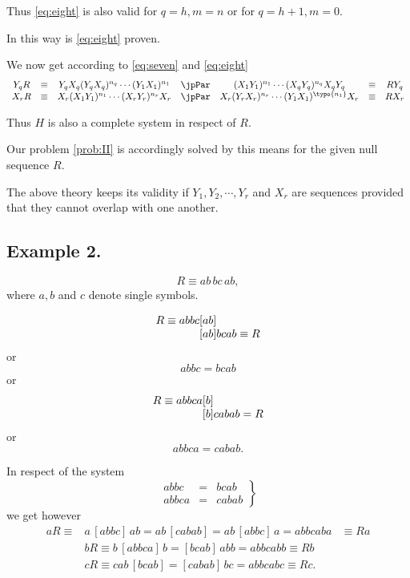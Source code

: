 Thus \eqref{eq:eight} is also valid for $q=h, m=n$ or for  $q=h+1,
m=0$.

In this way is \eqref{eq:eight} proven.

We now get according to \eqref{eq:seven} and \eqref{eq:eight}
$$\begin{array}{ccccccc}
Y_q R &\equiv& Y_qX_q(Y_qX_q)^{n_q}\cdots(Y_1X_1)^{n_1} &\jpPar&
(X_1Y_1)^{n_1}\cdots(X_qY_q)^{n_q}X_qY_q &\equiv& RY_q\\
X_r R &\equiv& X_r(X_1Y_1)^{n_1}\cdots(X_rY_r)^{n_r}X_r &\jpPar&
X_r(Y_rX_r)^{n_r}\cdots(Y_1X_1)^{\typo{n_1}}X_r &\equiv& R X_r\\
\end{array}$$

Thus $H$ is also a complete system in respect of $R$.

\bigskip

Our problem \ref{prob:II} is accordingly solved by this means for the given
null sequence $R$.

The above theory keeps its validity if $Y_1,Y_2,\cdots,Y_r$ and
$X_r$ are sequences provided that they cannot overlap with one another.

\subsection{Example 2.}

$$R \equiv ab\, bc\, ab, $$
where $a, b$ and $c$ denote single symbols.

$$\begin{array}{r@{}c@{}l}
R \equiv abbc & [ab] \\
              & [ab] & bcab \equiv R
\end{array}$$
or
$$abbc = bcab$$
or
$$\begin{array}{r@{}c@{}l}
R \equiv abbca & [b] \\
              & [b] & cabab = R
\end{array}$$
or
$$abbca = cabab.$$

In respect of the system
$$\left.\begin{array}{rcl}
abbc &=& bcab \\
abbca &=& cabab 
\end{array}\right\}$$
we get however
$$\begin{array}{rcl}
aR \equiv & a\,[abbc]\,ab = ab\,[cabab] = ab\,[abbc]\,a = abbcaba & \equiv Ra
\\
& bR \equiv b\,[abbca]\,b = [bcab]\,abb = abbcabb \equiv Rb & \\
& cR \equiv cab\,[bcab] = [cabab]\,bc = abbcabc \equiv Rc.
\end{array}$$

